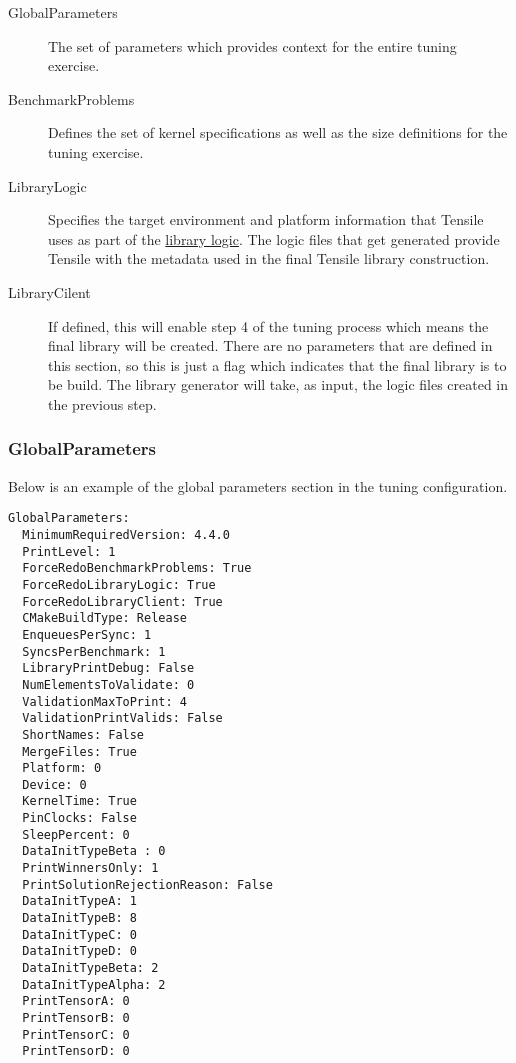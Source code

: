 \documentclass[]{article}
\begin{document}
\begin{description}
\item[GlobalParameters] The set of parameters which provides context for the entire tuning exercise.
\item[BenchmarkProblems] Defines the set of kernel specifications as well as the size definitions for the tuning exercise.
\item[LibraryLogic] Specifies the target environment and platform information that Tensile uses as part of the \hyperref[sec:LibraryLogic]{library logic}. The logic files that get generated provide Tensile with the metadata used in the final Tensile library construction.
\item[LibraryCilent] If defined, this will enable step 4 of the tuning process which means the final library will be created. There are no parameters that are defined in this section, so this is just a flag which indicates that the final library is to be build. The library generator will take, as input, the logic files created in the previous step.
\end{description}

\subsubsection{GlobalParameters}

\noindent
Below is an example of the global parameters section in the tuning configuration. 

\begin{verbatim}
GlobalParameters:
  MinimumRequiredVersion: 4.4.0
  PrintLevel: 1
  ForceRedoBenchmarkProblems: True
  ForceRedoLibraryLogic: True
  ForceRedoLibraryClient: True
  CMakeBuildType: Release
  EnqueuesPerSync: 1
  SyncsPerBenchmark: 1
  LibraryPrintDebug: False
  NumElementsToValidate: 0
  ValidationMaxToPrint: 4
  ValidationPrintValids: False
  ShortNames: False
  MergeFiles: True
  Platform: 0
  Device: 0
  KernelTime: True
  PinClocks: False
  SleepPercent: 0
  DataInitTypeBeta : 0
  PrintWinnersOnly: 1
  PrintSolutionRejectionReason: False
  DataInitTypeA: 1
  DataInitTypeB: 8
  DataInitTypeC: 0
  DataInitTypeD: 0
  DataInitTypeBeta: 2
  DataInitTypeAlpha: 2
  PrintTensorA: 0
  PrintTensorB: 0
  PrintTensorC: 0
  PrintTensorD: 0
\end{verbatim}
\end{document}

